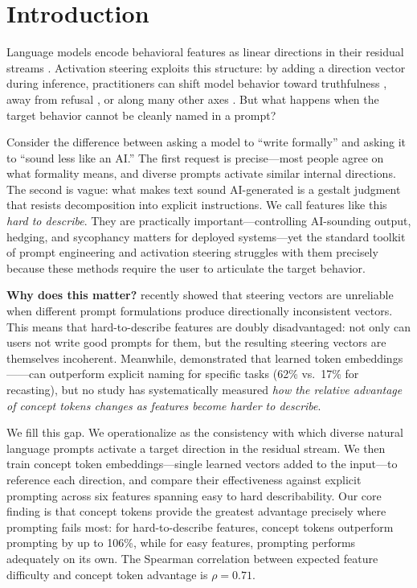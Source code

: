 \section{Introduction}
\label{sec:intro}

Language models encode behavioral features as linear directions in their residual streams \cite{park2024linear, zou2023representation}. Activation steering exploits this structure: by adding a direction vector during inference, practitioners can shift model behavior toward truthfulness \cite{li2023inference}, away from refusal \cite{arditi2024refusal}, or along many other axes \cite{turner2023steering, rimsky2023steering}. But what happens when the target behavior cannot be cleanly named in a prompt?

Consider the difference between asking a model to ``write formally'' and asking it to ``sound less like an AI.'' The first request is precise---most people agree on what formality means, and diverse prompts activate similar internal directions. The second is vague: what makes text sound AI-generated is a gestalt judgment that resists decomposition into explicit instructions. We call features like this \emph{hard to describe}. They are practically important---controlling AI-sounding output, hedging, and sycophancy matters for deployed systems---yet the standard toolkit of prompt engineering and activation steering struggles with them precisely because these methods require the user to articulate the target behavior.

{\bf Why does this matter?}
\citet{braun2025unreliability} recently showed that steering vectors are unreliable when different prompt formulations produce directionally inconsistent vectors. This means that hard-to-describe features are doubly disadvantaged: not only can users not write good prompts for them, but the resulting steering vectors are themselves incoherent. Meanwhile, \citet{sastre2026concept} demonstrated that learned token embeddings---\concepttokens---can outperform explicit naming for specific tasks (62\% vs.\ 17\% for recasting), but no study has systematically measured \emph{how the relative advantage of concept tokens changes as features become harder to describe}.

We fill this gap. We operationalize \describability as the consistency with which diverse natural language prompts activate a target direction in the residual stream. We then train concept token embeddings---single learned vectors added to the input---to reference each direction, and compare their effectiveness against explicit prompting across six features spanning easy to hard describability. Our core finding is that concept tokens provide the greatest advantage precisely where prompting fails most: for hard-to-describe features, concept tokens outperform prompting by up to 106\%, while for easy features, prompting performs adequately on its own. The Spearman correlation between expected feature difficulty and concept token advantage is $\rho = 0.71$.

